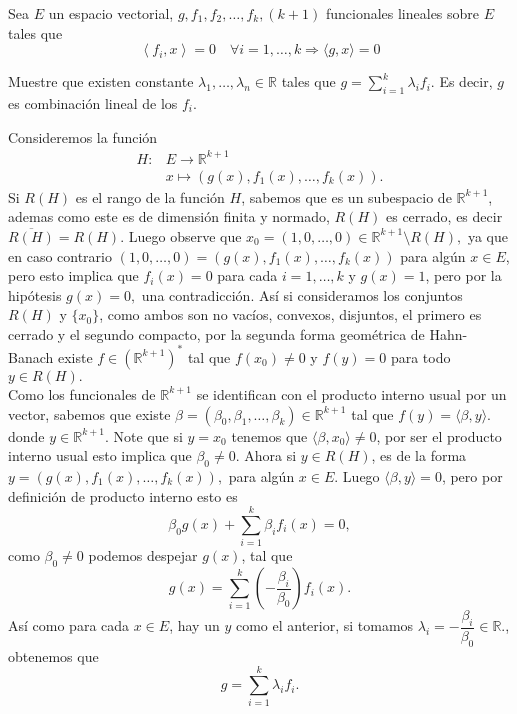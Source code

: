  Sea $E$ un espacio vectorial, $g, f_1, f_2, \ldots, f_k,(k+1)$ funcionales lineales sobre $E$ tales que
$$
\left\langle f_i, x\right\rangle=0 \quad \forall i=1, \ldots, k \Longrightarrow\langle g, x\rangle=0
$$

Muestre que existen constante $\lambda_1, \ldots, \lambda_n \in \mathbb{R}$ tales que $g=\sum_{i=1}^k \lambda_i f_i$. Es decir, $g$ es combinación lineal de los $f_i$.
\begin{sproof}
    Consideremos la función
    \begin{align*}
        H:&E\to \mathbb{R}^{k+1}\\
        &x\mapsto(g(x),f_1(x),\ldots,f_k(x)).
    \end{align*}
    Si $R(H)$ es el rango de la función $H$, sabemos que es un subespacio de $\mathbb{R}^{k+1}$, ademas como este es de dimensión finita y normado, $R(H)$ es cerrado, es decir $\overline{R(H)}=R(H).$ Luego observe que $x_0=(1,0,\ldots,0)\in \mathbb{R}^{k+1}\setminus R(H),$ ya que en caso contrario $(1,0,\ldots,0)=(g(x),f_1(x),\ldots,f_k(x))$ para algún $x\in E$, pero esto implica que $f_i(x)=0$ para cada $i=1,\ldots,k$ y $g(x)=1$, pero por la hipótesis $g(x)=0,$ una contradicción. Así si consideramos los conjuntos $R(H)$ y $\{x_0\}$, como ambos son no vacíos, convexos, disjuntos, el primero es cerrado y el segundo compacto, por la segunda forma geométrica de Hahn-Banach existe $f\in (\mathbb{R}^{k+1})^*$ tal que $f(x_0)\neq 0$ y $f(y)=0$ para todo $y\in R(H).$\\

    Como los funcionales de $\mathbb{R}^{k+1}$ se identifican con el producto interno usual por un vector, sabemos que existe $\beta=(\beta_0,\beta_1,\ldots,\beta_k)\in \mathbb{R}^{k+1}$ tal que $f(y)=\langle \beta,y\rangle.$ donde $y\in \mathbb{R}^{k+1}.$ Note que si $y=x_0$ tenemos que $\langle \beta,x_0\rangle\neq 0$, por ser el producto interno usual esto implica que $\beta_0\neq 0.$ Ahora si $y\in R(H)$, es de la forma $y=(g(x),f_1(x),\ldots,f_k(x)),$ para algún $x\in E.$ Luego $\langle \beta,y\rangle=0$, pero por definición de producto interno esto es 
    $$\beta_0g(x)+\sum_{i=1}^k\beta_if_i(x)=0,$$
    como $\beta_0\neq 0$ podemos despejar $g(x)$, tal que
    $$g(x)=\sum_{i=1}^k\left(-\frac{\beta_i}{\beta_0}\right)f_i(x).$$
    Así como para cada $x\in E$, hay un $y$ como el anterior, si tomamos $\lambda_i=-\dfrac{\beta_i}{\beta_0}\in \mathbb{R}.$, obtenemos que
    $$g=\sum_{i=1}^k \lambda_i f_i.$$
\end{sproof}